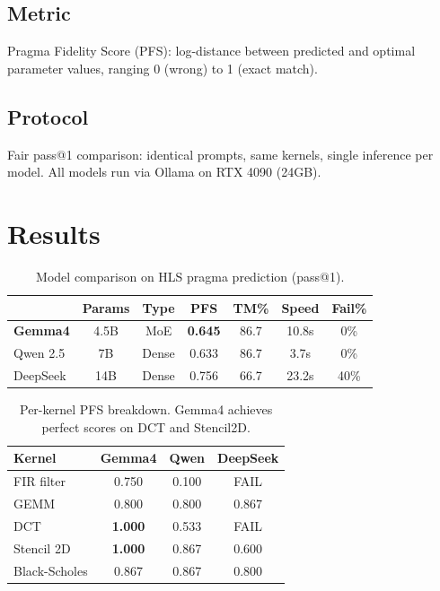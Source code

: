 \documentclass[11pt]{article}
\begin{document}
\subsection{Metric}
Pragma Fidelity Score (PFS): log-distance between predicted and
optimal parameter values, ranging 0 (wrong) to 1 (exact match).

\subsection{Protocol}
Fair pass@1 comparison: identical prompts, same kernels, single
inference per model. All models run via Ollama on RTX 4090 (24GB).

\section{Results}

\begin{table}[t]
\centering
\caption{Model comparison on HLS pragma prediction (pass@1).}
\label{tab:results}
\begin{tabular}{lcccccc}
\toprule
& \textbf{Params} & \textbf{Type} & \textbf{PFS} & \textbf{TM\%} & \textbf{Speed} & \textbf{Fail\%} \\
\midrule
\textbf{Gemma4}  & 4.5B & MoE   & \textbf{0.645} & 86.7 & 10.8s & 0\% \\
Qwen 2.5   & 7B   & Dense & 0.633 & 86.7 & 3.7s  & 0\% \\
DeepSeek   & 14B  & Dense & 0.756 & 66.7 & 23.2s & 40\% \\
\bottomrule
\end{tabular}
\end{table}

\begin{table}[t]
\centering
\caption{Per-kernel PFS breakdown. Gemma4 achieves perfect scores
on DCT and Stencil2D.}
\label{tab:perkernel}
\begin{tabular}{lccc}
\toprule
\textbf{Kernel} & \textbf{Gemma4} & \textbf{Qwen} & \textbf{DeepSeek} \\
\midrule
FIR filter      & 0.750 & 0.100 & FAIL \\
GEMM            & 0.800 & 0.800 & 0.867 \\
DCT             & \textbf{1.000} & 0.533 & FAIL \\
Stencil 2D      & \textbf{1.000} & 0.867 & 0.600 \\
Black-Scholes   & 0.867 & 0.867 & 0.800 \\
\bottomrule
\end{tabular}
\end{table}
\end{document}
